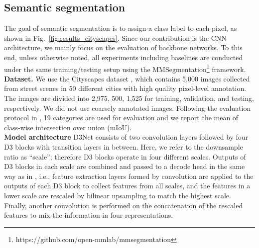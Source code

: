 \documentclass[final]{cvpr}
\begin{document}
\subsection{Semantic segmentation}
The goal of semantic segmentation is to assign a class label to each pixel, as shown in Fig.~\ref{fig:results_cityscapes}. Since our contribution is the CNN architecture, we mainly focus on the evaluation of backbone networks. 
To this end, unless otherwise noted, all experiments including baselines are conducted under the same training/testing setup using the MMSegmentation\footnote{https://github.com/open-mmlab/mmsegmentation} framework.
\vspace{3mm}\\
\textbf{Dataset.} \hspace{1mm}
We use the Cityscapes dataset \cite{Cordts2016Cityscapes}, which contains 5,000 images collected from street scenes in 50 different cities with high quality pixel-level annotation.
The images are divided into 2,975, 500, 1,525 for training, validation, and testing, respectively. We did not use coarsely annotated images.
Following the evaluation protocol in \cite{Cordts2016Cityscapes}, 19 categories are used for evaluation and we report the mean of class-wise intersection over union (mIoU).
\vspace{3mm}\\
\textbf{Model architecture} \hspace{1mm}
D3Net consists of two  convolution layers followed by four D3 blocks with transition layers in between. Here, we refer to the downsample ratio as ``scale''; therefore D3 blocks operate in four different scales. Outputs of D3 blocks in each scale are combined and passed to a decode head in the same way as in \cite{Long15,WangSCJDZLMTWLX19}, i.e., feature extraction layers formed by  convolution are applied to the outputs of each D3 block to collect features from all scales, and the features in a lower scale are rescaled by bilinear upsampling to match the highest scale. Finally, another  convolution is performed on the concatenation of the rescaled features to mix the information in four representations.
\end{document}
